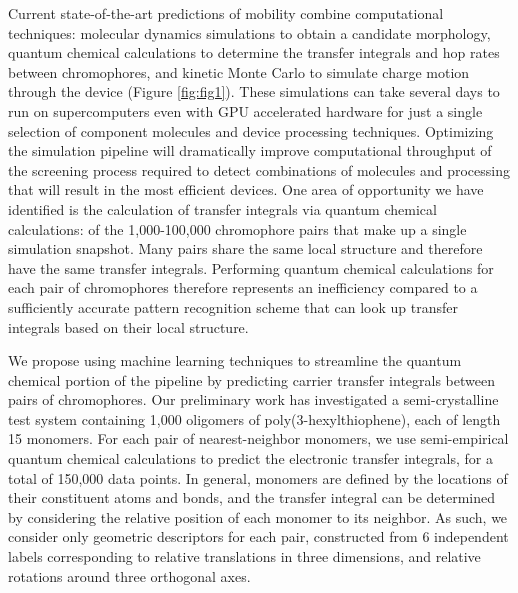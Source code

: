 \documentclass[12pt]{article}
\begin{document}
Current state-of-the-art predictions of mobility combine computational techniques: molecular dynamics simulations to obtain a candidate morphology, quantum chemical calculations to determine the transfer integrals and hop rates between chromophores, and kinetic Monte Carlo to simulate charge motion through the device (Figure \ref{fig:fig1})\cite{MorphCT,Jones2016,Jones2017}.
These simulations can take several days to run on supercomputers even with GPU accelerated hardware for just a single selection of component molecules and device processing techniques.
Optimizing the simulation pipeline will dramatically improve computational throughput of the screening process required to detect combinations of molecules and processing that will result in the most efficient devices.
One area of opportunity we have identified is the calculation of transfer integrals via quantum chemical calculations: of the 1,000-100,000 chromophore pairs that make up a single simulation snapshot.
Many pairs share the same local structure and therefore have the same transfer integrals.
Performing quantum chemical calculations for each pair of chromophores therefore represents an inefficiency compared to a sufficiently accurate pattern recognition scheme that can look up transfer integrals based on their local structure.

We propose using machine learning techniques to streamline the quantum chemical portion of the pipeline by predicting carrier transfer integrals between pairs of chromophores.
Our preliminary work has investigated a semi-crystalline test system containing 1,000 oligomers of poly(3-hexylthiophene), each of length 15 monomers.
For each pair of nearest-neighbor monomers, we use semi-empirical quantum chemical calculations to predict the electronic transfer integrals, for a total of 150,000 data points.
In general, monomers are defined by the locations of their constituent atoms and bonds, and the transfer integral can be determined by considering the relative position of each monomer to its neighbor.
As such, we consider only geometric descriptors for each pair, constructed from 6 independent labels corresponding to relative translations in three dimensions, and relative rotations around three orthogonal axes.
\end{document}
